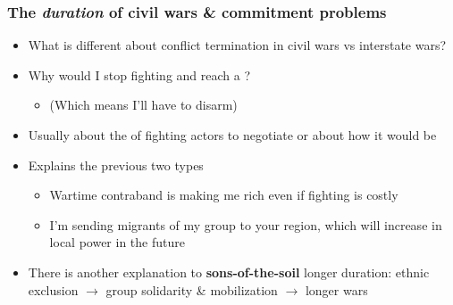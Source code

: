 \documentclass[aspectratio=43]{beamer}
\begin{document}
\begin{frame}
\frametitle{The \textit{duration} of civil wars \& commitment problems}
\centering

\begin{itemize}[<+->]
  \item What is different about conflict termination in civil wars vs interstate wars?
  \item Why would I stop fighting and reach a {}?
  \begin{itemize}
    \item (Which means I'll have to disarm)
  \end{itemize}
  \item Usually about the {\color{red}{incentives}} of fighting actors to negotiate or about how {\color{red}{credible}} it would be
  \item Explains the previous two types
  \begin{itemize}
    \item Wartime contraband is making me rich even if fighting is costly
    \item I'm sending migrants of my group to your region, which will increase in local power in the future
  \end{itemize}
  \item There is another explanation to \textbf{sons-of-the-soil} longer duration:
        ethnic exclusion $\rightarrow$ group solidarity \& mobilization $\rightarrow$ longer wars
\end{itemize}

\end{frame}
\end{document}
